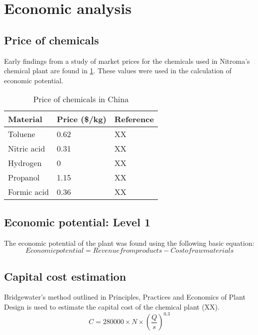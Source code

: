 \section{Economic analysis}
\label{app:economics}
\subsection{Price of chemicals}

Early findings from a study of market prices for the chemicals used in Nitroma's chemical plant are found in \cref{tab:material-prices}. These values were used in the calculation of economic potential.

\begin{table}[h] 
\centering
\caption{Price of chemicals in China}
\label{tab:material-prices}
\begin{tabular}{lll}
    \toprule
    Material    & Price (\$/kg) & Reference \\ \midrule
    Toluene     & 0.62          & XX        \\
    Nitric acid & 0.31          & XX        \\
    Hydrogen    & 0             & XX        \\
    Propanol    & 1.15          & XX        \\
    Formic acid & 0.36          & XX        \\ \bottomrule
\end{tabular}
\end{table}

\subsection{Economic potential: Level 1}
The economic potential of the plant was found using the following basic equation:
\begin{equation}
Economic potential = Revenue from products - Cost of raw materials
\end{equation}


\subsection{Capital cost estimation}

Bridgewater's method outlined in Principles, Practices and Economics of Plant Design is used to estimate the capital cost of the chemical plant (XX).
\begin{equation}
    C=280000 \times N \times \left(\frac{Q}{s}\right)^{0.3}
\end{equation}

